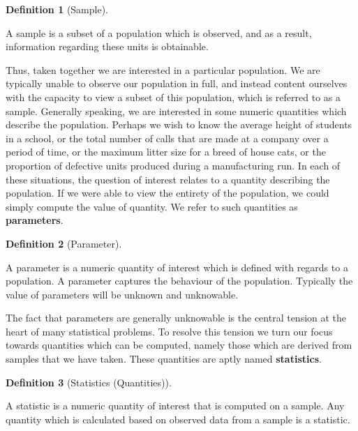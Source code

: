 \documentclass[
  letterpaper,
  DIV=11,
  numbers=noendperiod]{scrreprt}
\theoremstyle{definition}
\theoremstyle{definition}
\theoremstyle{definition}
\newtheorem{definition}{Definition}[chapter]
\theoremstyle{remark}
\begin{document}
\begin{definition}[Sample]\protect\hypertarget{def-sample}{}\label{def-sample}

A sample is a subset of a population which is observed, and as a result,
information regarding these units is obtainable.

\end{definition}

Thus, taken together we are interested in a particular population. We
are typically unable to observe our population in full, and instead
content ourselves with the capacity to view a subset of this population,
which is referred to as a sample. Generally speaking, we are interested
in some numeric quantities which describe the population. Perhaps we
wish to know the average height of students in a school, or the total
number of calls that are made at a company over a period of time, or the
maximum litter size for a breed of house cats, or the proportion of
defective units produced during a manufacturing run. In each of these
situations, the question of interest relates to a quantity describing
the population. If we were able to view the entirety of the population,
we could simply compute the value of quantity. We refer to such
quantities as \textbf{parameters}.

\begin{definition}[Parameter]\protect\hypertarget{def-parameter}{}\label{def-parameter}

A parameter is a numeric quantity of interest which is defined with
regards to a population. A parameter captures the behaviour of the
population. Typically the value of parameters will be unknown and
unknowable.

\end{definition}

The fact that parameters are generally unknowable is the central tension
at the heart of many statistical problems. To resolve this tension we
turn our focus towards quantities which can be computed, namely those
which are derived from samples that we have taken. These quantities are
aptly named \textbf{statistics}.

\begin{definition}[Statistics
(Quantities)]\protect\hypertarget{def-statistics-quantity}{}\label{def-statistics-quantity}

A statistic is a numeric quantity of interest that is computed on a
sample. Any quantity which is calculated based on observed data from a
sample is a statistic.

\end{definition}
\end{document}
